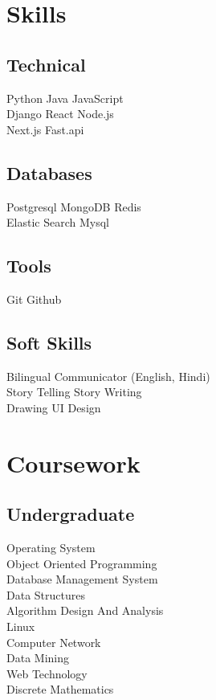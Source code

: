 \documentclass[]{deedy-resume-openfont}
\begin{document}
\begin{minipage}[t]{0.33\textwidth}

\section{Skills}
\subsection{Technical}
Python \textbullet{}   Java \textbullet{} JavaScript \\ \textbullet{} Django  \textbullet{} React \textbullet{} Node.js \\ \textbullet{} Next.js  \textbullet{} Fast.api
\subsection{Databases}
Postgresql\textbullet{}  MongoDB \textbullet{}  Redis \\
Elastic Search\textbullet{}  Mysql
\subsection{Tools}
Git\textbullet{}  Github
\subsection{Soft Skills}
Bilingual Communicator (English, Hindi) \\
\textbullet{} Story Telling \textbullet{} Story Writing \\
\textbullet{} Drawing \textbullet{} UI Design
\sectionsep


\section{Coursework}
\subsection{Undergraduate}
Operating System \\
Object Oriented Programming \\
Database Management System \\
Data Structures \\
Algorithm Design And Analysis \\
Linux \\
Computer Network \\
Data Mining \\
Web Technology \\
Discrete Mathematics \\
\sectionsep


\end{minipage}
\end{document}
